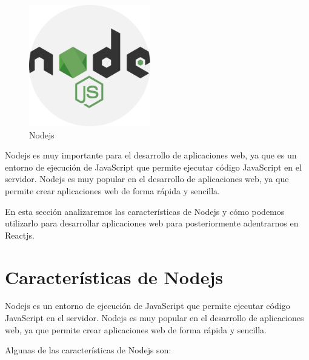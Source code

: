\documentclass[
  a4paper,
  DIV=11,
  numbers=noendperiod,
  onepage,
  openany]{scrreprt}
\begin{document}
\begin{tcolorbox}
\begin{figure}[H]

{\centering \includegraphics[width=2.08333in,height=\textheight]{images/node-logo.png}

}

\caption{Nodejs}

\end{figure}%

Nodejs es muy importante para el desarrollo de aplicaciones web, ya que
es un entorno de ejecución de JavaScript que permite ejecutar código
JavaScript en el servidor. Nodejs es muy popular en el desarrollo de
aplicaciones web, ya que permite crear aplicaciones web de forma rápida
y sencilla.

En esta sección analizaremos las características de Nodejs y cómo
podemos utilizarlo para desarrollar aplicaciones web para posteriormente
adentrarnos en Reactjs.

\section{Características de Nodejs}\label{caracteruxedsticas-de-nodejs}

Nodejs es un entorno de ejecución de JavaScript que permite ejecutar
código JavaScript en el servidor. Nodejs es muy popular en el desarrollo
de aplicaciones web, ya que permite crear aplicaciones web de forma
rápida y sencilla.

Algunas de las características de Nodejs son:


\end{tcolorbox}
\end{document}

